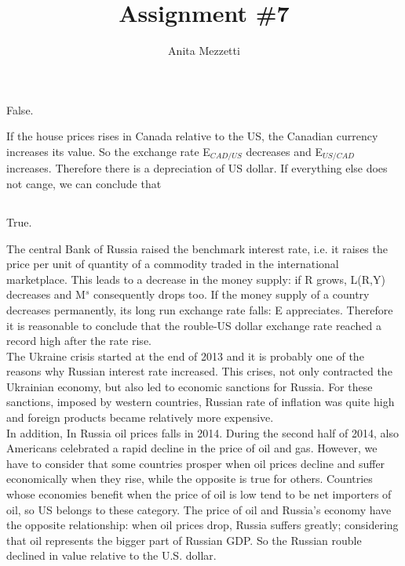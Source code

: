 \documentclass[	11pt, ]{fphw}
\title{Assignment \#7} %
\author{Anita Mezzetti}
\institute{École polytechnique fédérale de Lausanne}
\begin{document}
\maketitle

\section{}\subsection{}
False.
\par If the house prices rises in Canada relative to the US, the Canadian currency increases its value. So the exchange rate E$_{CAD/US}$ decreases and E$_{US/CAD}$ increases. Therefore there is a depreciation of US dollar. If everything else does not cange, we can conclude that


\subsection{}
True.
\par The central Bank of Russia raised the benchmark interest rate, i.e. it raises the price per unit of quantity of a commodity traded in the international marketplace. This leads to a decrease in the money supply: if R grows, L(R,Y) decreases and M$^{s}$ consequently drops too. If the money supply of a country decreases permanently, its long run exchange rate falls: E appreciates. Therefore it is reasonable to conclude that the rouble-US dollar exchange rate reached a record high after the rate rise. \\
The Ukraine crisis started at the end of 2013 and it is probably one of the reasons why Russian interest rate increased. This crises, not only contracted the Ukrainian economy, but also led to economic sanctions for Russia. For these sanctions, imposed by western countries, Russian rate of inflation was quite high and foreign products became relatively more expensive. 
\\
In addition, In Russia oil prices falls in 2014. During the second half of 2014, also Americans celebrated a rapid decline in the price of oil and gas. However, we have to consider that some countries prosper when oil prices decline and suffer economically when they rise, while the opposite is true for others. Countries whose economies benefit when the price of oil is low tend to be net importers of oil, so US belongs to these category. The price of oil and Russia's economy have the opposite relationship: when oil prices drop, Russia suffers greatly; considering that oil represents the bigger part of Russian GDP. So the Russian rouble declined in value relative to the U.S. dollar.
\end{document}
